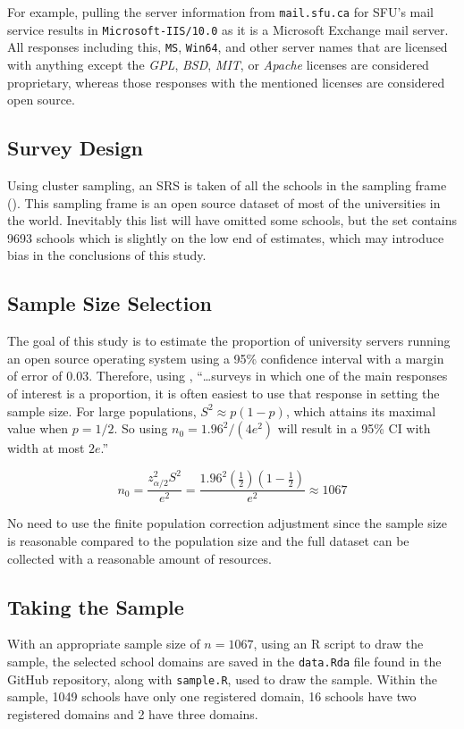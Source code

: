 \documentclass{article}
\theoremstyle{definition}
\begin{document}
\begin{flushleft}
\begin{multicols}{2}
For example, pulling the server information from \texttt{mail.sfu.ca} for
SFU's mail service results in \texttt{Microsoft-IIS/10.0} as it is a
Microsoft Exchange mail server. All responses including this, \texttt{MS},
\texttt{Win64}, and other server names that are licensed with anything
except the \textit{GPL}, \textit{BSD}, \textit{MIT}, or \textit{Apache}
licenses are considered proprietary, whereas those responses with
the mentioned licenses are considered open source.

\subsection{Survey Design}

Using cluster
sampling, an SRS is taken of all the schools in the sampling
frame (\cite{Hipo}). This sampling frame is an open source dataset
of most of the universities in the world. Inevitably
this list will have omitted some schools, but the set
contains 9693 schools which is slightly on the low
end of estimates, which may introduce bias in the
conclusions of this study.

\subsection{Sample Size Selection}
The goal of this study is
to estimate the proportion of university servers
running an open source operating system using a 95\% confidence
interval with a margin of error of 0.03.
Therefore, using
\cite{lohr2019},
``\dots surveys in which one of the main responses of interest
is a proportion, it is often easiest to use that response
in setting the sample size.
For large populations, $S^2 \approx p(1-p)$, which
attains its maximal value when $p=1/2$. So using
$n_0=1.96^2/(4e^2)$ will result in a 95\% CI with width at most
$2e$.''

$$
	n_0
	=
	\frac{
		z^2_{\alpha/2}S^2
	}{
		e^2
	}
	=
	\frac{
		1.96^2(\frac{1}{2})(1-\frac{1}{2})
	}{
		e^2
	}
	\approx
	1067
$$

No need to use the finite population correction adjustment
since the sample size
is reasonable compared to the population size and the full
dataset can be collected with a reasonable amount of resources.

\subsection{Taking the Sample}
With an appropriate sample size of $n=1067$,
using an R script to
draw the sample, the selected school domains
are saved in the \texttt{data.Rda} file found
in the GitHub repository, along with \texttt{sample.R},
used to draw the sample.
Within the sample, 1049 schools have only
one registered domain, 16 schools have two
registered domains and 2 have three
domains.


\end{multicols}
\end{flushleft}
\end{document}
